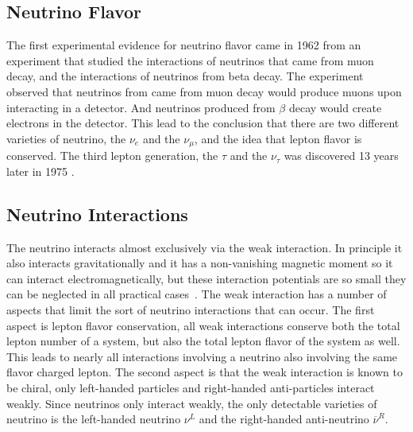 \subsection{Neutrino Flavor}
The first experimental evidence for neutrino flavor came in 1962 from an
experiment \citep{lederman_muon_flavor} that studied the interactions of
neutrinos that came from muon decay, and the interactions of neutrinos
from beta decay.
The experiment observed that neutrinos from came from muon decay would produce
muons upon interacting in a detector.
And neutrinos produced from $\beta$ decay would create electrons in the
detector.
This lead to the conclusion that there are two different varieties of neutrino,
the $\nu_e$ and the $\nu_{\mu}$, and the idea that lepton flavor is conserved.
The third lepton generation, the $\tau$ and the $\nu_{\tau}$ was discovered 13
years later in 1975 \citep{tau_discovery}.

\subsection{Neutrino Interactions}
The neutrino interacts almost exclusively via the weak interaction.
In principle it also interacts gravitationally and it has a non-vanishing
magnetic moment so it can interact electromagnetically, but these
interaction potentials are so small they can be neglected in all practical
cases~\cite{neutrino_magmom}.
The weak interaction has a number of aspects that limit the sort of neutrino
interactions that can occur. The first aspect is lepton flavor conservation,
all weak interactions conserve both the total lepton number of a system, but also
the total lepton flavor of the system as well.
This leads to nearly all interactions involving a neutrino also involving the
same flavor charged lepton.
The second aspect is that the weak interaction is known to be chiral,
only left-handed particles and right-handed anti-particles interact weakly.
Since neutrinos only interact weakly, the only detectable varieties of neutrino
is the left-handed neutrino $\nu^{L}$  and the right-handed anti-neutrino $\overline{\nu}^{R}$.

